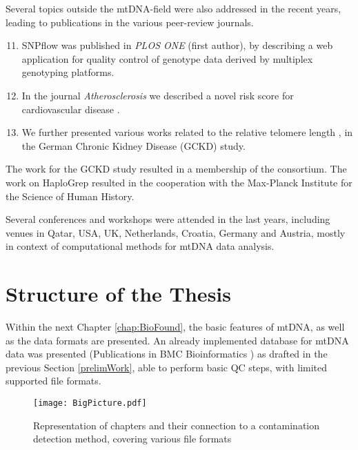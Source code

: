 Several topics outside the mtDNA-field were also addressed in the recent years, leading to publications in the various peer-review journals.
\begin{enumerate}
\setcounter{enumi}{10}
\item SNPflow  \cite{Weissensteiner2013} was published in \textit{PLOS ONE} (first author), by describing a web application  for quality control of genotype data derived by multiplex genotyping platforms. 
\item In the journal \textit{Atherosclerosis} we described a novel risk score for cardiovascular disease \cite{Lamina2014}.
\item We further presented various works related to the relative telomere length \cite{Raschenberger2015assoc,Raschenberger2015dotelomeres}, in the German Chronic Kidney Disease (GCKD) study.


\end{enumerate}
The work for the GCKD study resulted in a membership of the consortium. The work on HaploGrep resulted in the cooperation with the Max-Planck Institute for the Science of Human History.




Several conferences and workshops were attended in the last years, including venues in Qatar, USA, UK, Netherlands, Croatia, Germany and Austria, mostly in context of computational methods for mtDNA data analysis. 

\section{Structure of the Thesis}
\label{sect:ProblChar}
Within the next Chapter \ref{chap:BioFound}, the basic features of mtDNA, as well as the data formats are presented. An already implemented database for mtDNA data was presented (Publications in BMC Bioinformatics \cite{Schoenherr2009, Weissensteiner2010}) as drafted in the previous Section \ref{prelimWork}, able to perform basic QC steps, with limited supported file formats.
\begin{figure}[ht]
\begin{center}
\texttt{[image: BigPicture.pdf]}
\caption[Representation of chapters]{Representation of chapters and their connection to a contamination detection method, covering various file formats }
\label{fig:figureBigPic}
\end{center}
\end{figure}

